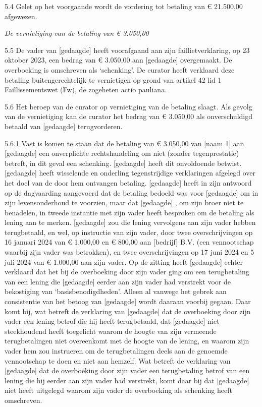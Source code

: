 \documentclass[
  dutch,
  a4paper,
]{article}
\begin{document}
5.4 Gelet op het voorgaande wordt de vordering tot betaling van € 21.500,00 afgewezen.

\emph{De vernietiging van de betaling van € 3.050,00}

5.5 De vader van {[}gedaagde{]} heeft voorafgaand aan zijn faillietverklaring, op 23 oktober 2023, een bedrag van € 3.050,00 aan {[}gedaagde{]} overgemaakt. De overboeking is omschreven als `schenking'. De curator heeft verklaard deze betaling buitengerechtelijk te vernietigen op grond van artikel 42 lid 1 Faillissementswet (Fw), de zogeheten actio pauliana.

5.6 Het beroep van de curator op vernietiging van de betaling slaagt. Als gevolg van de vernietiging kan de curator het bedrag van € 3.050,00 als onverschuldigd betaald van {[}gedaagde{]} terugvorderen.

5.6.1 Vast is komen te staan dat de betaling van € 3.050,00 van {[}naam 1{]} aan {[}gedaagde{]} een onverplichte rechtshandeling om niet (zonder tegenprestatie) betreft, in dit geval een schenking. {[}gedaagde{]} heeft dit onvoldoende betwist. {[}gedaagde{]} heeft wisselende en onderling tegenstrijdige verklaringen afgelegd over het doel van de door hem ontvangen betaling. {[}gedaagde{]} heeft in zijn antwoord op de dagvaarding aangevoerd dat de betaling bedoeld was voor {[}gedaagde{]} om in zijn levensonderhoud te voorzien, maar dat {[}gedaagde{]} , om zijn broer niet te benadelen, in tweede instantie met zijn vader heeft besproken om de betaling als lening aan te merken. {[}gedaagde{]} zou die lening vervolgens aan zijn vader hebben terugbetaald, en wel, op instructie van zijn vader, door twee overschrijvingen op 16 januari 2024 van € 1.000,00 en € 800,00 aan {[}bedrijf{]} B.V. (een vennootschap waarbij zijn vader was betrokken), en twee overschrijvingen op 17 juni 2024 en 5 juli 2024 van € 1.000,00 aan zijn vader. Op de zitting heeft {[}gedaagde{]} echter verklaard dat het bij de overboeking door zijn vader ging om een terugbetaling van een lening die {[}gedaagde{]} eerder aan zijn vader had verstrekt voor de bekostiging van `basisbenodigdheden'. Alleen al vanwege het gebrek aan consistentie van het betoog van {[}gedaagde{]} wordt daaraan voorbij gegaan. Daar komt bij, wat betreft de verklaring van {[}gedaagde{]} dat de overboeking door zijn vader een lening betrof die hij heeft terugbetaald, dat {[}gedaagde{]} niet steekhoudend heeft toegelicht waarom de hoogte van zijn vermeende terugbetalingen niet overeenkomt met de hoogte van de lening, en waarom zijn vader hem zou instrueren om de terugbetalingen deels aan de genoemde vennootschap te doen en niet aan hemzelf. Wat betreft de verklaring van {[}gedaagde{]} dat de overboeking door zijn vader een terugbetaling betrof van een lening die hij eerder aan zijn vader had verstrekt, komt daar bij dat {[}gedaagde{]} niet heeft uitgelegd waarom zijn vader de overboeking als schenking heeft omschreven.
\end{document}
